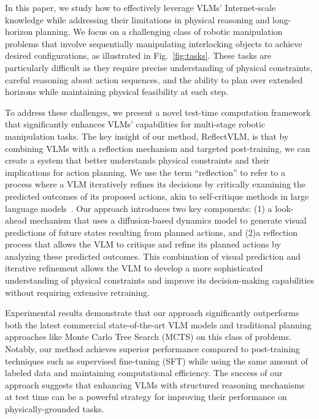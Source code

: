 In this paper, we study how to effectively leverage VLMs' Internet-scale knowledge while addressing their limitations in physical reasoning and long-horizon planning. We focus on a challenging class of robotic manipulation problems that involve sequentially manipulating interlocking objects to achieve desired configurations, as illustrated in Fig.~\ref{fig:tasks}. These tasks are particularly difficult as they require precise understanding of physical constraints, careful reasoning about action sequences, and the ability to plan over extended horizons while maintaining physical feasibility at each step.


To address these challenges, we present a novel test-time computation framework that significantly enhances VLMs' capabilities for multi-stage robotic manipulation tasks. 
The key insight of our method, ReflectVLM, is that by combining VLMs with a reflection mechanism and targeted post-training, we can create a system that better understands physical constraints and their implications for action planning. We use the term ``reflection'' to refer to a process where a VLM iteratively refines its decisions by critically examining the predicted outcomes of its proposed actions, akin to self-critique methods in large language models~\citep{huang2024llmcorrect, wang2023selfinstructaligninglanguagemodels, madaan2024self}. Our approach introduces two key components: (1) a look-ahead mechanism that uses a diffusion-based dynamics model to generate visual predictions of future states resulting from planned actions, and (2)a reflection process that allows the VLM to critique and refine its planned actions by analyzing these predicted outcomes. This combination of visual prediction and iterative refinement allows the VLM to develop a more sophisticated understanding of physical constraints and improve its decision-making capabilities without requiring extensive retraining.

Experimental results demonstrate that our approach significantly outperforms both the latest commercial state-of-the-art VLM models and traditional planning approaches like Monte Carlo Tree Search (MCTS) on this class of problems. Notably, our method achieves superior performance compared to post-training techniques such as supervised fine-tuning (SFT) while using the same amount of labeled data and maintaining computational efficiency. The success of our approach suggests that enhancing VLMs with structured reasoning mechanisms at test time can be a powerful strategy for improving their performance on physically-grounded tasks.

